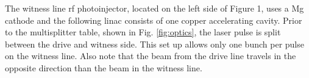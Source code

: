 The witness line rf photoinjector, located on the left side of Figure
1, uses a Mg cathode and the following linac consists of one copper
accelerating cavity. Prior to the multisplitter table, shown in
Fig. \ref{fig:optics}, the laser pulse is split between the drive and witness side.
This set up allows only one bunch per pulse on the witness line. Also
note that the beam from the drive line travels in the opposite direction
than the beam in the witness line. 



